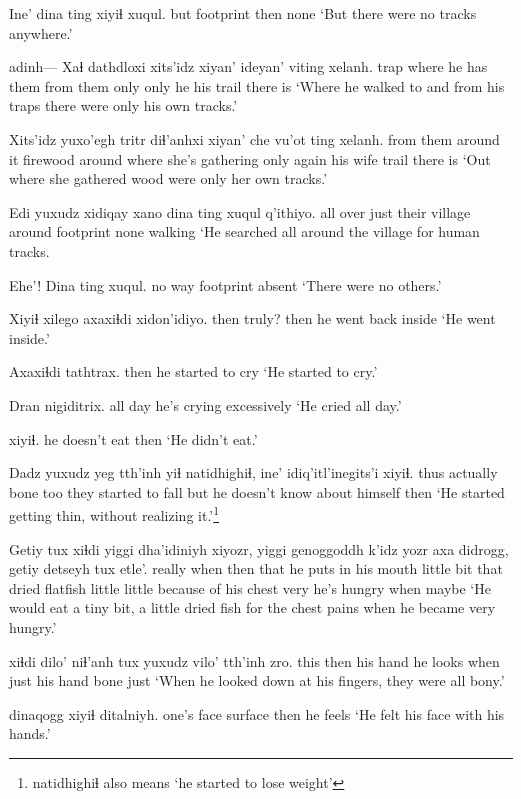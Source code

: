 \documentclass[12pt]{article}
\begin{document}
\gll Ine' {dina ting} xiyiɬ xuqul.
but footprint then none
\glt `But there were no tracks anywhere.'
\glend

\gll adinh--- Xaɬ dathdloxi xits'idz xiyan' ideyan' viting xelanh.
{} trap {where he has them} {from them} only {only he} {his trail} {there is}
\glt `Where he walked to and from his traps there were only his own tracks.'
\glend

\gll Xits'idz yuxo'egh tritr diɬ'anhxi xiyan' che vu'ot ting xelanh.
{from them} {around it} firewood {around where she's gathering} only again {his wife} trail {there is}
\glt `Out where she gathered wood were only her own tracks.'
\glend

\gll Edi yuxudz xidiqay xano {dina ting} xuqul q'ithiyo.
{all over} just {their village} around {footprint} none walking
\glt `He searched all around the village for human tracks. 
\glend

\gll   Ehe'! {Dina ting} xuqul.
{no way} footprint absent
\glt `There were no others.'
\glend

\gll Xiyiɬ xilego axaxiɬdi xidon'idiyo.
then truly? then {he went back inside}
\glt `He went inside.'
\glend

\gll Axaxiɬdi tathtrax.
then {he started to cry}
\glt `He started to cry.'
\glend

\gll Dran nigiditrix.
{all day} {he's crying excessively}
\glt `He cried all day.'
\glend

 xiyiɬ.
{{he doesn't eat}} then
\glt `He didn't eat.'
\glend

\gll  Dadz {yuxudz yeg} tth'inh yiɬ natidhighiɬ, ine' {idiq'itl'inegits'i} xiyiɬ.
thus actually bone too {they started to fall} but {he doesn't know about himself} then
\glt `He started getting thin, without realizing it.'\footnote{natidhighiɬ also means `he started to lose weight'}
\glend

\gll Getiy tux xiɬdi yiggi dha'idiniyh xiyozr, yiggi genoggoddh k'idz yozr axa didrogg, getiy detseyh tux etle'.
really when then that {he puts in his mouth} {little bit} that {dried flatfish} little little {because of} {his chest} very {he's hungry} when maybe 
\glt `He would eat a tiny bit, a little dried fish for the chest pains when he became very hungry.'
\glend

 xiɬdi dilo' niɬ'anh tux yuxudz vilo' tth'inh zro.
this  then {his hand} {he looks} when just {his hand} bone just
\glt `When he looked down at his fingers, they were all bony.'
\glend

 dinaqogg xiyiɬ ditalniyh.
{} {one's face surface} then {he feels}
\glt `He felt his face with his hands.'
\glend
\end{document}
